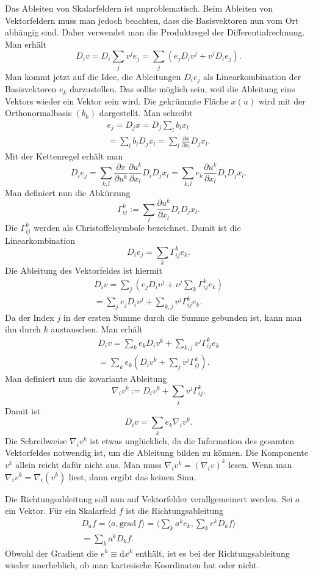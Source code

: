 \documentclass[a4paper,10pt,fleqn,twocolumn,twoside]{article}
\begin{document}
Das Ableiten von Skalarfeldern ist unproblematisch. Beim Ableiten von
Vektorfeldern muss man jedoch beachten, dass die Basisvektoren nun
vom Ort abhängig sind. Daher verwendet man die Produktregel der
Differentialrechnung. Man erhält
\[D_i v = D_i\sum_{j}v^je_j
= \sum_{j}(e_jD_i v^j+v^jD_i e_j).\]
Man kommt jetzt auf die Idee, die Ableitungen $D_ie_j$ als
Linearkombination der Basisvektoren $e_k$ darzustellen. Das sollte
möglich sein, weil die Ableitung eins Vektors wieder ein Vektor sein
wird. Die gekrümmte Fläche $x(u)$ wird mit der Orthonormalbasis
$(b_k)$ dargestellt. Man schreibt
\begin{gather*}
e_j = D_jx = D_j\sum_{l} b_lx_l\\
= \sum_{l}b_l D_jx_l
= \sum_{l}\frac{\partial x}{\partial x_l}D_jx_l.
\end{gather*}
Mit der Kettenregel erhält man
\[D_ie_j = \sum_{k,l}\frac{\partial x}{\partial u^k}
\frac{\partial u^k}{\partial x_l}D_iD_jx_l
= \sum_{k,l}e_k\frac{\partial u^k}{\partial x_l}D_iD_jx_l.\]
Man definiert nun die Abkürzung
\[\Gamma_{ij}^k := \sum_{l}\frac{\partial u^k}
{\partial x_l}D_iD_jx_l.\]
Die $\Gamma_{ij}^k$ werden als Christoffelsymbole bezeichnet.
Damit ist die Linearkombination
\[D_ie_j = \sum_{k} \Gamma_{ij}^k e_k.\]
Die Ableitung des Vektorfeldes ist hiermit
\begin{gather*}
D_i v  = \sum_{j}(e_jD_i v^j+v^j\sum_{k} \Gamma_{ij}^k e_k)\\
= \sum_{j}e_jD_i v^j+\sum_{k,j}v^j \Gamma_{ij}^k e_k.
\end{gather*}
Da der Index $j$ in der ersten Summe durch die Summe gebunden ist,
kann man ihn durch $k$ austauschen. Man erhält
\begin{gather*}
D_i v = \sum_{k}e_kD_i v^k+\sum_{k,j}v^j \Gamma_{ij}^k e_k\\
= \sum_{k}e_k(D_i v^k+\sum_{j}v^j\Gamma_{ij}^k).
\end{gather*}
Man definiert nun die kovariante Ableitung
\[\nabla_i v^k := D_i v^k+\sum_{j}v^j\Gamma_{ij}^k.\]
Damit ist
\[D_i v = \sum_{k}e_k\nabla_i v^k.\]
Die Schreibweise $\nabla_i v^k$ ist etwas unglücklich, da die
Information des gesamten Vektorfeldes notwendig ist, um die Ableitung
bilden zu können. Die Komponente $v^k$ allein reicht dafür nicht
aus. Man muss $\nabla_i v^k=(\nabla_i v)^k$ lesen. Wenn man
$\nabla_i v^k=\nabla_i(v^k)$ liest, dann ergibt das keinen Sinn.

Die Richtungsableitung soll nun auf Vektorfelder verallgemeinert
werden. Sei $a$ ein Vektor. Für ein Skalarfeld $f$ ist die
Richtungsableitung
\begin{gather*}
{D_a}f = \langle a,\mathrm{grad}\,f\rangle
= \langle \sum_k a^ke_k,\sum_k e^k D_k f\rangle\\
= \sum_k a^k D_k f.
\end{gather*}
Obwohl der Gradient die $e^k\equiv\mathrm dx^k$ enthält, ist es bei
der Richtungsableitung wieder unerheblich, ob man kartesische
Koordinaten hat oder nicht.
\end{document}
